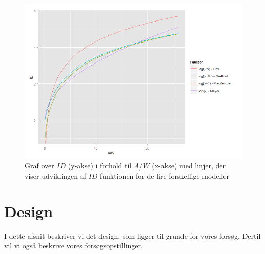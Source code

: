 \begin{figure}[h]
\centering
\includegraphics[width=\linewidth]{images/plots/plot_comparison_id}
\caption{Graf over $ID$ (y-akse) i forhold til $A/W$ (x-akse) med linjer, der viser udviklingen af $ID$-funktionen for de fire forskellige modeller}
\label{fig:Sammenligning}
\end{figure}

\chapter*{Design}
I dette afsnit beskriver vi det design, som ligger til grunde for vores forsøg. Dertil vil vi også beskrive vores forsøgsopstillinger.

